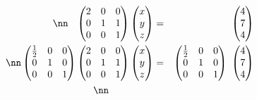 \begin{example}
\begin{eqnarray*}
\\\nn %
\phantom{-}
\begin{pmatrix}
2 & 0 & 0 \\
0 & 1 & 1  \\ 
0& 0 & 1  \\
\end{pmatrix} 
\begin{pmatrix}
 x \\ 
y \\
z 
\end{pmatrix} 
&=&
\phantom{
\begin{pmatrix}
0 & 1 & 0  \\ 
1 & 0 & 0 \\
0& 0 & 1  \\
\end{pmatrix} 
}
~
\begin{pmatrix}
4 \\
7 \\ 
4\\
\end{pmatrix} 
\\ \nn %
\begin{pmatrix}
\frac12 & 0 & 0  \\ 
0 & 1 & 0 \\
0& 0 & 1  \\
\end{pmatrix} 
\begin{pmatrix}
2 & 0 & 0 \\
0 & 1 & 1  \\ 
0& 0 & 1  \\
\end{pmatrix} 
\begin{pmatrix}
 x \\ 
y \\
z 
\end{pmatrix} 
&=&
\begin{pmatrix}
\frac12 & 0 & 0  \\ 
0 & 1 &  0\\
0& 0 & 1  \\
\end{pmatrix} 
~
\begin{pmatrix}
4 \\
7 \\ 
4\\
\end{pmatrix} 
\\\nn %
\phantom{
\begin{pmatrix}
\frac12 & 0 & 0  \\ 

\end{pmatrix}}
\end{eqnarray*}
\end{example}
